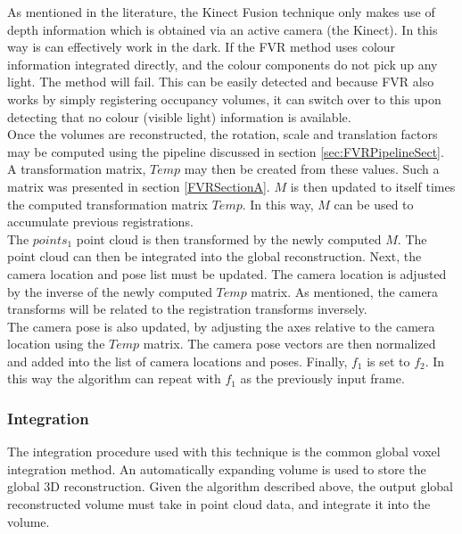As mentioned in the literature, the Kinect Fusion technique only makes use of depth information which is obtained via an active camera (the Kinect). In this way is can effectively work in the dark. If the FVR method uses colour information integrated directly, and the colour components do not pick up any light. The method will fail. This can be easily detected and because FVR also works by simply registering occupancy volumes, it can switch over to this upon detecting that no colour (visible light) information is available. \\

Once the volumes are reconstructed, the rotation, scale and translation factors may be computed using the pipeline discussed in section \ref{sec:FVRPipelineSect}. A transformation matrix, $Temp$ may then be created from these values. Such a matrix was presented in section \ref{FVRSectionA}. $M$ is then updated to itself times the computed transformation matrix $Temp$. In this way, $M$ can be used to accumulate previous registrations. \\

The $points_1$ point cloud is then transformed by the newly computed $M$. The point cloud can then be integrated into the global reconstruction. Next, the camera location and pose list must be updated. The camera location is adjusted by the inverse of the newly computed $Temp$ matrix. As mentioned, the camera transforms will be related to the registration transforms inversely. \\

The camera pose is also updated, by adjusting the axes relative to the camera location using the $Temp$ matrix. The camera pose vectors are then normalized and added into the list of camera locations and poses. Finally, $f_1$ is set to $f_2$. In this way the algorithm can repeat with $f_1$ as the previously input frame. \\  



\subsubsection{Integration}

The integration procedure used with this technique is the common global voxel integration method. An automatically expanding volume is used to store the global 3D reconstruction. Given the algorithm described above, the output global reconstructed volume must take in point cloud data, and integrate it into the volume. \\

